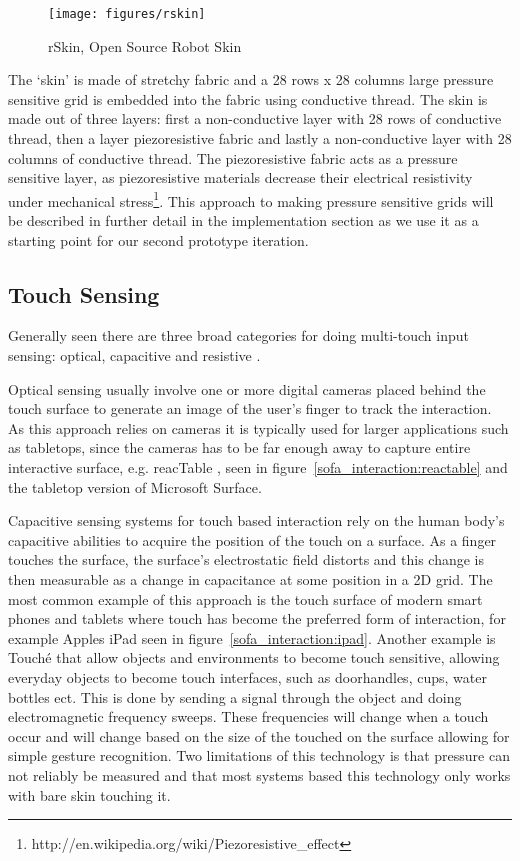 \begin{figure}[h]
	\centering
  		\texttt{[image: figures/rskin]}
	\caption{rSkin, Open Source Robot Skin}
   \label{rskin}
\end{figure}
The `skin' is made of stretchy fabric and a 28 rows x 28 columns large pressure sensitive grid is embedded into the fabric using conductive thread.
The skin is made out of three layers: first a non-conductive layer with 28 rows of conductive thread, then a layer piezoresistive fabric and lastly a non-conductive layer with 28 columns of conductive thread.
The piezoresistive fabric acts as a pressure sensitive layer, as piezoresistive materials decrease their electrical resistivity under mechanical stress\footnote{http://en.wikipedia.org/wiki/Piezoresistive\_effect}.
This approach to making pressure sensitive grids will be described in further detail in the implementation section as we use it as a starting point for our second prototype iteration.

\subsection{Touch Sensing}
\label{ch:textiletouch:related:touch}

Generally seen there are three broad categories for doing multi-touch input sensing: optical, capacitive and resistive \citep{rosenberg2009unmousepad}.

Optical sensing usually involve one or more digital cameras placed behind the touch surface to generate an image of the user's finger to track the interaction.
As this approach relies on cameras it is typically used for larger applications such as tabletops, since the cameras has to be far enough away to capture entire interactive surface, e.g. reacTable \citep{jorda2007reactable}, seen in figure~\ref{sofa_interaction:reactable} and the tabletop version of Microsoft Surface.

Capacitive sensing systems for touch based interaction rely on the human body's capacitive abilities to acquire the position of the touch on a surface. 
As a finger touches the surface, the surface's electrostatic field distorts and this change is then measurable as a change in capacitance at some position in a 2D grid.
The most common example of this approach is the touch surface of modern smart phones and tablets where touch has become the preferred form of interaction, for example Apples iPad seen in figure~\ref{sofa_interaction:ipad}.
Another example is Touch\'e \citep{sato2012touche} that allow objects and environments to become touch sensitive, allowing everyday objects to become touch interfaces, such as doorhandles, cups, water bottles ect.
This is done by sending a signal through the object and doing electromagnetic frequency sweeps. 
These frequencies will change when a touch occur and will change based on the size of the touched on the surface allowing for simple gesture recognition.
Two limitations of this technology is that pressure can not reliably be measured and that most systems based this technology only works with bare skin touching it.    

